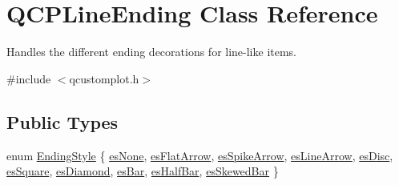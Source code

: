 \hypertarget{class_q_c_p_line_ending}{}\section{Q\+C\+P\+Line\+Ending Class Reference}
\label{class_q_c_p_line_ending}


Handles the different ending decorations for line-\/like items.  




{\ttfamily \#include $<$qcustomplot.\+h$>$}

\subsection*{Public Types}
\begin{DoxyCompactItemize}
\item 
enum \mbox{\hyperlink{class_q_c_p_line_ending_a5ef16e6876b4b74959c7261d8d4c2cd5}{Ending\+Style}} \{ \newline
\mbox{\hyperlink{class_q_c_p_line_ending_a5ef16e6876b4b74959c7261d8d4c2cd5aca12d500f50cd6871766801bac30fb03}{es\+None}}, 
\mbox{\hyperlink{class_q_c_p_line_ending_a5ef16e6876b4b74959c7261d8d4c2cd5a3d7dcea2f100671727c3417142154f8f}{es\+Flat\+Arrow}}, 
\mbox{\hyperlink{class_q_c_p_line_ending_a5ef16e6876b4b74959c7261d8d4c2cd5ab9964d0d03f812d1e79de15edbeb2cbf}{es\+Spike\+Arrow}}, 
\mbox{\hyperlink{class_q_c_p_line_ending_a5ef16e6876b4b74959c7261d8d4c2cd5a61f78ee8f375fb21cb9d250687bbcbd2}{es\+Line\+Arrow}}, 
\newline
\mbox{\hyperlink{class_q_c_p_line_ending_a5ef16e6876b4b74959c7261d8d4c2cd5ae5a3414916817258bcc6dddd605e8f5c}{es\+Disc}}, 
\mbox{\hyperlink{class_q_c_p_line_ending_a5ef16e6876b4b74959c7261d8d4c2cd5ae1836502fa43d8990bb62b2d493a140a}{es\+Square}}, 
\mbox{\hyperlink{class_q_c_p_line_ending_a5ef16e6876b4b74959c7261d8d4c2cd5a378fe5a8b768411b0bc1765210fe7200}{es\+Diamond}}, 
\mbox{\hyperlink{class_q_c_p_line_ending_a5ef16e6876b4b74959c7261d8d4c2cd5a2cf543bbca332df26d89bf779f50469f}{es\+Bar}}, 
\newline
\mbox{\hyperlink{class_q_c_p_line_ending_a5ef16e6876b4b74959c7261d8d4c2cd5a126c390f0c359fcd8df1fc5e38d26d5b}{es\+Half\+Bar}}, 
\mbox{\hyperlink{class_q_c_p_line_ending_a5ef16e6876b4b74959c7261d8d4c2cd5a2b2cc96e757ca9bcd91fb70221ed43ab}{es\+Skewed\+Bar}}
 \}
\end{DoxyCompactItemize}
